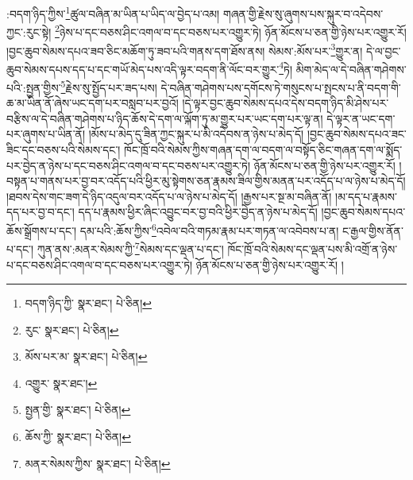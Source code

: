 :བདག་ཉིད་ཀྱིས་\footnote{བདག་ཉིད་ཀྱི་  སྣར་ཐང་།  པེ་ཅིན། }ཚུལ་བཞིན་མ་ཡིན་པ་ཡིད་ལ་བྱེད་པ་འམ། གཞན་གྱི་རྗེས་སུ་ཞུགས་པས་སྐུར་བ་འདེབས་ཀྱང་:རུང་སྟེ། \footnote{རུང་  སྣར་ཐང་།  པེ་ཅིན། }ཉེས་པ་དང་བཅས་ཤིང་འགལ་བ་དང་བཅས་པར་འགྱུར་ཏེ། ཉོན་མོངས་པ་ཅན་གྱི་ཉེས་པར་འགྱུར་རོ། །བྱང་ཆུབ་སེམས་དཔའ་ཟབ་ཅིང་མཆོག་ཏུ་ཟབ་པའི་གནས་དག་ཐོས་ནས། སེམས་:མོས་པར་\footnote{མོས་པར་མ་  སྣར་ཐང་།  པེ་ཅིན། }གྱུར་ན། དེ་ལ་བྱང་ཆུབ་སེམས་དཔས་དད་པ་དང་གཡོ་མེད་པས་འདི་ལྟར་བདག་ནི་ལོང་བར་གྱུར་\footnote{འགྱུར་  སྣར་ཐང་། }ཏེ། མིག་མེད་ལ་དེ་བཞིན་གཤེགས་པའི་:སྤྱན་གྱིས་\footnote{སྤྱན་གྱི་  སྣར་ཐང་།  པེ་ཅིན། }རྗེས་སུ་སྤྱོད་པར་ཟད་པས། དེ་བཞིན་གཤེགས་པས་དགོངས་ཏེ་གསུངས་པ་སྤངས་པ་ནི་བདག་གི་ཆ་མ་ཡིན་ནོ་ཞེས་ཡང་དག་པར་བསླབ་པར་བྱའོ། །དེ་ལྟར་བྱང་ཆུབ་སེམས་དཔའ་དེས་བདག་ཉིད་མི་ཤེས་པར་བརྩིས་ལ་དེ་བཞིན་གཤེགས་པ་ཉིད་ཆོས་དེ་དག་ལ་ལྐོག་ཏུ་མ་གྱུར་པར་ཡང་དག་པར་ལྟ་ན། དེ་ལྟར་ན་ཡང་དག་པར་ཞུགས་པ་ཡིན་ནོ། །མོས་པ་མེད་དུ་ཟིན་ཀྱང་སྐུར་པ་མི་འདེབས་ན་ཉེས་པ་མེད་དོ། །བྱང་ཆུབ་སེམས་དཔའ་ཟང་ཟིང་དང་བཅས་པའི་སེམས་དང་། ཁོང་ཁྲོ་བའི་སེམས་ཀྱིས་གཞན་དག་ལ་བདག་ལ་བསྟོད་ཅིང་གཞན་དག་ལ་སྨོད་པར་བྱེད་ན་ཉེས་པ་དང་བཅས་ཤིང་འགལ་བ་དང་བཅས་པར་འགྱུར་ཏེ། ཉོན་མོངས་པ་ཅན་གྱི་ཉེས་པར་འགྱུར་རོ། །བསྟན་པ་གནས་པར་བྱ་བར་འདོད་པའི་ཕྱིར་མུ་སྟེགས་ཅན་རྣམས་ཟིལ་གྱིས་མནན་པར་འདོད་པ་ལ་ཉེས་པ་མེད་དོ། །ཐབས་དེས་གང་ཟག་དེ་ཉིད་འདུལ་བར་འདོད་པ་ལ་ཉེས་པ་མེད་དོ། །རྒྱས་པར་སྔ་མ་བཞིན་ནོ། །མ་དད་པ་རྣམས་དད་པར་བྱ་བ་དང་། དད་པ་རྣམས་ཕྱིར་ཞིང་འབྱུང་བར་བྱ་བའི་ཕྱིར་བྱེད་ན་ཉེས་པ་མེད་དོ། །བྱང་ཆུབ་སེམས་དཔའ་ཆོས་སྒྲོགས་པ་དང་། དམ་པའི་:ཆོས་ཀྱིས་\footnote{ཆོས་ཀྱི་  སྣར་ཐང་།  པེ་ཅིན། }འབེལ་བའི་གཏམ་རྣམ་པར་གཏན་ལ་འབེབས་པ་ན། ང་རྒྱལ་གྱིས་ནོན་པ་དང་། ཀུན་ནས་:མནར་སེམས་ཀྱི་\footnote{མནར་སེམས་ཀྱིས་  སྣར་ཐང་།  པེ་ཅིན། }སེམས་དང་ལྡན་པ་དང་། ཁོང་ཁྲོ་བའི་སེམས་དང་ལྡན་པས་མི་འགྲོ་ན་ཉེས་པ་དང་བཅས་ཤིང་འགལ་བ་དང་བཅས་པར་འགྱུར་ཏེ། ཉོན་མོངས་པ་ཅན་གྱི་ཉེས་པར་འགྱུར་རོ། །

